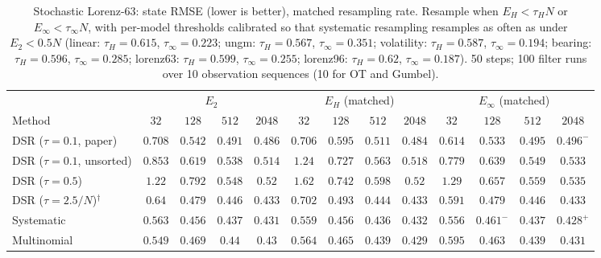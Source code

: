\begin{table}[ht]
\centering
\small
\caption{Stochastic Lorenz-63: state RMSE (lower is better), matched resampling rate. Resample when $E_H<\tau_HN$ or $E_\infty<\tau_\infty N$, with per-model thresholds calibrated so that systematic resampling resamples as often as under $E_2<0.5N$ (linear: $\tau_H{=}0.615$, $\tau_\infty{=}0.223$; ungm: $\tau_H{=}0.567$, $\tau_\infty{=}0.351$; volatility: $\tau_H{=}0.587$, $\tau_\infty{=}0.194$; bearing: $\tau_H{=}0.596$, $\tau_\infty{=}0.285$; lorenz63: $\tau_H{=}0.599$, $\tau_\infty{=}0.255$; lorenz96: $\tau_H{=}0.62$, $\tau_\infty{=}0.187$). 50 steps; 100 filter runs over 10 observation sequences (10 for OT and Gumbel).}
\label{tab:trigger-matched-lorenz63-rmse}
\begin{adjustbox}{max width=\linewidth}
\begin{tabular}{lcccc|cccc|cccc}
\toprule
 & \multicolumn{4}{c}{$E_2$} & \multicolumn{4}{c}{$E_H$ (matched)} & \multicolumn{4}{c}{$E_\infty$ (matched)} \\
\cmidrule(lr){2-5} \cmidrule(lr){6-9} \cmidrule(lr){10-13}
Method & $32$ & $128$ & $512$ & $2048$ & $32$ & $128$ & $512$ & $2048$ & $32$ & $128$ & $512$ & $2048$ \\
\midrule
DSR ($\tau{=}0.1$, paper) & $0.708$ & $0.542$ & $\mathbf{0.491}$ & $0.486$ & $0.706$ & $0.595$ & $0.511$ & $\mathbf{0.484}$ & $\mathbf{0.614}$ & $\mathbf{0.533}$ & $0.495$ & $0.496^{-}$ \\
DSR ($\tau{=}0.1$, unsorted) & $0.853$ & $\mathbf{0.619}$ & $\mathbf{0.538}$ & $\mathbf{0.514}$ & $1.24$ & $0.727$ & $0.563$ & $0.518$ & $\mathbf{0.779}$ & $0.639$ & $0.549$ & $0.533$ \\
DSR ($\tau{=}0.5$) & $\mathbf{1.22}$ & $0.792$ & $\mathbf{0.548}$ & $\mathbf{0.52}$ & $1.62$ & $0.742$ & $0.598$ & $\mathbf{0.52}$ & $1.29$ & $\mathbf{0.657}$ & $0.559$ & $0.535$ \\
DSR ($\tau{=}2.5/N$)$^\dagger$ & $0.64$ & $\mathbf{0.479}$ & $0.446$ & $0.433$ & $0.702$ & $0.493$ & $\mathbf{0.444}$ & $0.433$ & $\mathbf{0.591}$ & $0.479$ & $0.446$ & $\mathbf{0.433}$ \\
\midrule
Systematic & $0.563$ & $0.456$ & $0.437$ & $0.431$ & $0.559$ & $\mathbf{0.456}$ & $\mathbf{0.436}$ & $0.432$ & $\mathbf{0.556}$ & $0.461^{-}$ & $0.437$ & $\mathbf{0.428}^{+}$ \\
Multinomial & $\mathbf{0.549}$ & $0.469$ & $0.44$ & $0.43$ & $0.564$ & $0.465$ & $\mathbf{0.439}$ & $\mathbf{0.429}$ & $0.595$ & $\mathbf{0.463}$ & $0.439$ & $0.431$ \\

\end{tabular}
\end{adjustbox}
\end{table}
